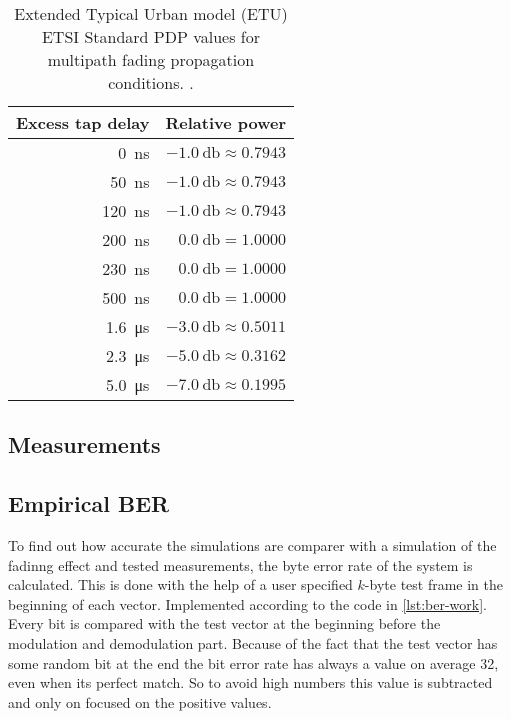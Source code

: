 
\begin{table}[b]
	\centering
	\begin{tabular}{rr}
		\toprule
		\bfseries Excess tap delay & \bfseries Relative power \\
		\midrule
		\SI{   0}{\nano\second} & \(\SI{-1.0}{\decibel} \approx 0.7943\) \\
		\SI{  50}{\nano\second} & \(\SI{-1.0}{\decibel} \approx 0.7943\) \\
		\SI{ 120}{\nano\second} & \(\SI{-1.0}{\decibel} \approx 0.7943\) \\
		\SI{ 200}{\nano\second} & \(\SI{ 0.0}{\decibel} = 1.0000\) \\
		\SI{ 230}{\nano\second} & \(\SI{ 0.0}{\decibel} = 1.0000\) \\
		\SI{ 500}{\nano\second} & \(\SI{ 0.0}{\decibel} = 1.0000\) \\
		\SI{1.6}{\micro\second} & \(\SI{-3.0}{\decibel} \approx 0.5011\) \\
		\SI{2.3}{\micro\second} & \(\SI{-5.0}{\decibel} \approx 0.3162\) \\
		\SI{5.0}{\micro\second} & \(\SI{-7.0}{\decibel} \approx 0.1995\) \\
		\bottomrule
	\end{tabular}
	\caption{Extended Typical Urban model (ETU) ETSI Standard PDP values for multipath fading propagation conditions. \cite{ETSI}. \label{tab:etsi-tap-values}}
\end{table}

% 	


\subsection{Measurements}


\subsection{Empirical BER} \label{sec:ber}
To find out how accurate the simulations are comparer with a simulation of the fadinng effect and tested measurements, the byte error rate of the system is calculated. This is done with the help of a user specified \(k\)-byte test frame in the beginning of each vector. Implemented according to the code in \ref{lst:ber-work}. Every bit is compared with the test vector at the beginning before the modulation and demodulation part. 
Because of the fact that the test vector has some random bit at the end the bit error rate has always a value on average 32, even when its perfect match.  So to avoid high numbers this value is subtracted and only on focused on the positive values. 

